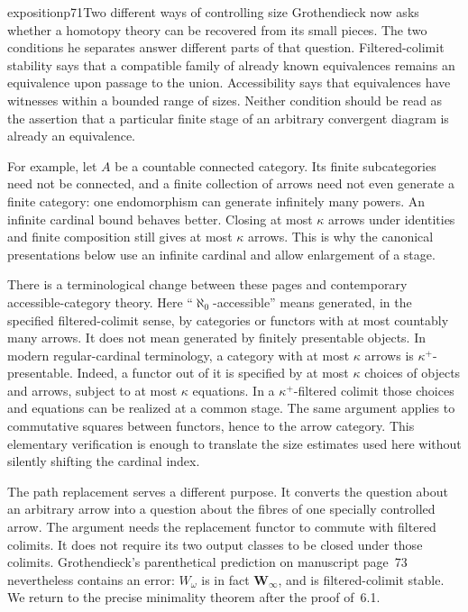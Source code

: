 \begin{dcomment}{exposition}{p71}{Two different ways of controlling size}
Grothendieck now asks whether a homotopy theory can be recovered from its small pieces. The two conditions he separates answer different parts of that question. Filtered-colimit stability says that a compatible family of already known equivalences remains an equivalence upon passage to the union. Accessibility says that equivalences have witnesses within a bounded range of sizes. Neither condition should be read as the assertion that a particular finite stage of an arbitrary convergent diagram is already an equivalence.

For example, let $A$ be a countable connected category. Its finite subcategories need not be connected, and a finite collection of arrows need not even generate a finite category: one endomorphism can generate infinitely many powers. An infinite cardinal bound behaves better. Closing at most $\kappa$ arrows under identities and finite composition still gives at most $\kappa$ arrows. This is why the canonical presentations below use an infinite cardinal and allow enlargement of a stage.

There is a terminological change between these pages and contemporary accessible-category theory. Here ``$\aleph_0$-accessible'' means generated, in the specified filtered-colimit sense, by categories or functors with at most countably many arrows. It does not mean generated by finitely presentable objects. In modern regular-cardinal terminology, a category with at most $\kappa$ arrows is $\kappa^+$-presentable. Indeed, a functor out of it is specified by at most $\kappa$ choices of objects and arrows, subject to at most $\kappa$ equations. In a $\kappa^+$-filtered colimit those choices and equations can be realized at a common stage. The same argument applies to commutative squares between functors, hence to the arrow category. This elementary verification is enough to translate the size estimates used here without silently shifting the cardinal index.

The path replacement serves a different purpose. It converts the question about an arbitrary arrow into a question about the fibres of one specially controlled arrow. The argument needs the replacement functor to commute with filtered colimits. It does not require its two output classes to be closed under those colimits. Grothendieck's parenthetical prediction on manuscript page~73 nevertheless contains an error: $W_\omega$ is in fact $\mathbf W_\infty$, and is filtered-colimit stable. We return to the precise minimality theorem after the proof of~6.1.
\end{dcomment}

